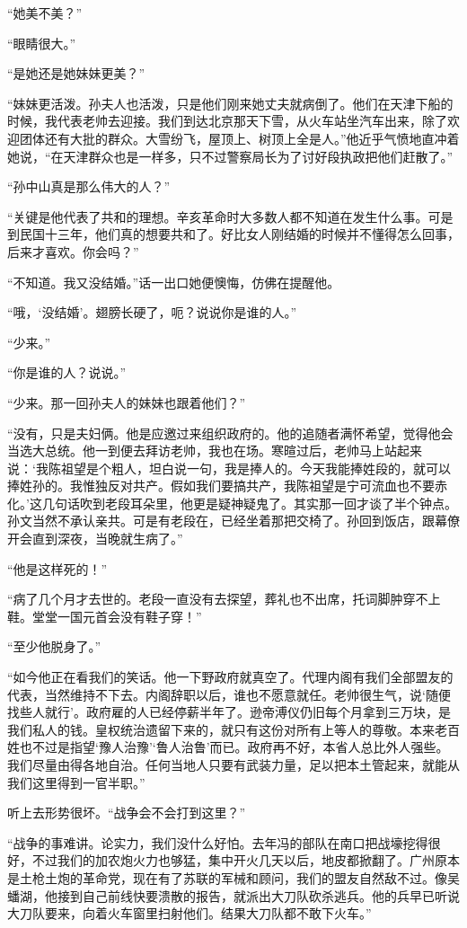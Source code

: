 \par “她美不美？”
\par “眼睛很大。”
\par “是她还是她妹妹更美？”
\par “妹妹更活泼。孙夫人也活泼，只是他们刚来她丈夫就病倒了。他们在天津下船的时候，我代表老帅去迎接。我们到达北京那天下雪，从火车站坐汽车出来，除了欢迎团体还有大批的群众。大雪纷飞，屋顶上、树顶上全是人。”他近乎气愤地直冲着她说，“在天津群众也是一样多，只不过警察局长为了讨好段执政把他们赶散了。”
\par “孙中山真是那么伟大的人？”
\par “关键是他代表了共和的理想。辛亥革命时大多数人都不知道在发生什么事。可是到民国十三年，他们真的想要共和了。好比女人刚结婚的时候并不懂得怎么回事，后来才喜欢。你会吗？”
\par “不知道。我又没结婚。”话一出口她便懊悔，仿佛在提醒他。
\par “哦，‘没结婚’。翅膀长硬了，呃？说说你是谁的人。”
\par “少来。”
\par “你是谁的人？说说。”
\par “少来。那一回孙夫人的妹妹也跟着他们？”
\par “没有，只是夫妇俩。他是应邀过来组织政府的。他的追随者满怀希望，觉得他会当选大总统。他一到便去拜访老帅，我也在场。寒暄过后，老帅马上站起来说：‘我陈祖望是个粗人，坦白说一句，我是捧人的。今天我能捧姓段的，就可以捧姓孙的。我惟独反对共产。假如我们要搞共产，我陈祖望是宁可流血也不要赤化。’这几句话吹到老段耳朵里，他更是疑神疑鬼了。其实那一回才谈了半个钟点。孙文当然不承认亲共。可是有老段在，已经坐着那把交椅了。孙回到饭店，跟幕僚开会直到深夜，当晚就生病了。”
\par “他是这样死的！”
\par “病了几个月才去世的。老段一直没有去探望，葬礼也不出席，托词脚肿穿不上鞋。堂堂一国元首会没有鞋子穿！”
\par “至少他脱身了。”
\par “如今他正在看我们的笑话。他一下野政府就真空了。代理内阁有我们全部盟友的代表，当然维持不下去。内阁辞职以后，谁也不愿意就任。老帅很生气，说‘随便找些人就行’。政府雇的人已经停薪半年了。逊帝溥仪仍旧每个月拿到三万块，是我们私人的钱。皇权统治遗留下来的，就只有这份对所有上等人的尊敬。本来老百姓也不过是指望‘豫人治豫’‘鲁人治鲁’而已。政府再不好，本省人总比外人强些。我们尽量由得各地自治。任何当地人只要有武装力量，足以把本土管起来，就能从我们这里得到一官半职。”
\par 听上去形势很坏。“战争会不会打到这里？”
\par “战争的事难讲。论实力，我们没什么好怕。去年冯的部队在南口把战壕挖得很好，不过我们的加农炮火力也够猛，集中开火几天以后，地皮都掀翻了。广州原本是土枪土炮的革命党，现在有了苏联的军械和顾问，我们的盟友自然敌不过。像吴蟠湖，他接到自己前线快要溃散的报告，就派出大刀队砍杀逃兵。他的兵早已听说大刀队要来，向着火车窗里扫射他们。结果大刀队都不敢下火车。”

